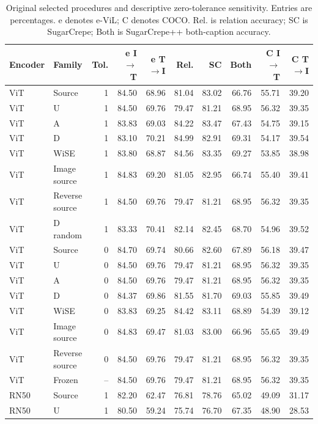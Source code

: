 \begin{table}[t]
\centering
\scriptsize
\setlength{\tabcolsep}{3pt}
\begin{tabular}{llrrrrrrrr}
\toprule
Encoder & Family & Tol. & e I$\to$T & e T$\to$I & Rel. & SC & Both & C I$\to$T & C T$\to$I\\
\midrule
ViT & Source & 1 & 84.50 & 68.96 & 81.04 & 83.02 & 66.76 & 55.71 & 39.20\\
ViT & U & 1 & 84.50 & 69.76 & 79.47 & 81.21 & 68.95 & 56.32 & 39.35\\
ViT & A & 1 & 83.83 & 69.03 & 84.22 & 83.47 & 67.43 & 54.75 & 39.15\\
ViT & D & 1 & 83.10 & 70.21 & 84.99 & 82.91 & 69.31 & 54.17 & 39.54\\
ViT & WiSE & 1 & 83.80 & 68.87 & 84.56 & 83.35 & 69.27 & 53.85 & 38.98\\
ViT & Image source & 1 & 84.83 & 69.20 & 81.05 & 82.95 & 66.74 & 55.40 & 39.41\\
ViT & Reverse source & 1 & 84.50 & 69.76 & 79.47 & 81.21 & 68.95 & 56.32 & 39.35\\
ViT & D random & 1 & 83.33 & 70.41 & 82.14 & 82.45 & 68.70 & 54.96 & 39.52\\
ViT & Source & 0 & 84.70 & 69.74 & 80.66 & 82.60 & 67.89 & 56.18 & 39.47\\
ViT & U & 0 & 84.50 & 69.76 & 79.47 & 81.21 & 68.95 & 56.32 & 39.35\\
ViT & A & 0 & 84.50 & 69.76 & 79.47 & 81.21 & 68.95 & 56.32 & 39.35\\
ViT & D & 0 & 84.37 & 69.86 & 81.55 & 81.70 & 69.03 & 55.85 & 39.49\\
ViT & WiSE & 0 & 83.83 & 69.25 & 84.42 & 83.11 & 68.89 & 54.39 & 39.12\\
ViT & Image source & 0 & 84.83 & 69.47 & 81.03 & 83.00 & 66.96 & 55.65 & 39.49\\
ViT & Reverse source & 0 & 84.50 & 69.76 & 79.47 & 81.21 & 68.95 & 56.32 & 39.35\\
ViT & Frozen & -- & 84.50 & 69.76 & 79.47 & 81.21 & 68.95 & 56.32 & 39.35\\
RN50 & Source & 1 & 82.20 & 62.47 & 76.81 & 78.76 & 65.02 & 49.09 & 31.17\\
RN50 & U & 1 & 80.50 & 59.24 & 75.74 & 76.70 & 67.35 & 48.90 & 28.53\\
\bottomrule
\end{tabular}
\caption{Original selected procedures and descriptive zero-tolerance sensitivity. Entries are percentages. e denotes e-ViL; C denotes COCO. Rel. is relation accuracy; SC is SugarCrepe; Both is SugarCrepe++ both-caption accuracy.}\label{tab:originalmetrics0}
\end{table}


